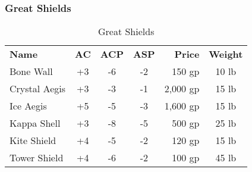 
\subsubsection{Great Shields}

\begin{table}[htb]
\caption{Great Shields}
\centering
\begin{tabular}{l *{3}{c} r c}
\textbf{Name} & \textbf{AC} & \textbf{ACP} & \textbf{ASP} & \textbf{Price} & \textbf{Weight}\\
Bone Wall & +3 & -6 & -2 & 150 gp & 10 lb\\
Crystal Aegis & +3 & -3 & -1 & 2,000 gp & 15 lb\\
Ice Aegis & +5 & -5 & -3 & 1,600 gp & 15 lb\\
Kappa Shell & +3 & -8 & -5 & 500 gp & 25 lb\\
Kite Shield & +4  & -5 & -2 & 120 gp & 15 lb\\
Tower Shield & +4 & -6 & -2 & 100 gp & 45 lb\\
\end{tabular}
\end{table}

